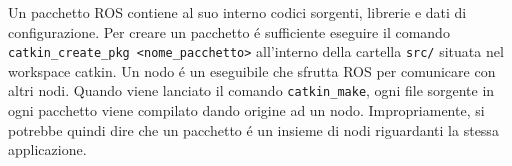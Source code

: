 Un pacchetto ROS contiene al suo interno codici sorgenti, librerie e dati di configurazione.
Per creare un pacchetto \'{e} sufficiente eseguire il comando \\
\verb|catkin_create_pkg <nome_pacchetto>| all'interno della cartella \verb|src/| situata nel workspace catkin.
Un nodo \'{e} un eseguibile che sfrutta ROS per comunicare con altri nodi.
Quando viene lanciato il comando \verb|catkin_make|, ogni file sorgente in ogni pacchetto viene compilato 
dando origine ad un nodo.
Impropriamente, si potrebbe quindi dire che un pacchetto \'{e} un insieme di nodi riguardanti la stessa applicazione.
